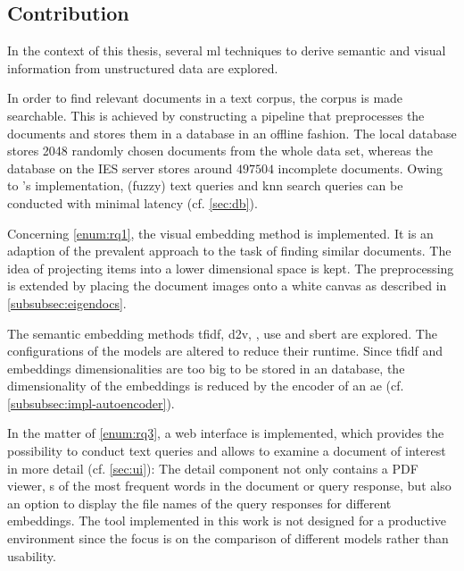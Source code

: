 \subsection{Contribution}\label{subsec:contribution}

In the context of this thesis, several \ac{ml} techniques to derive semantic and visual information 
from unstructured data are explored.

In order to find relevant documents in a text corpus, the corpus is made searchable.
This is achieved by constructing a pipeline that preprocesses the documents 
and stores them in a database in an offline fashion.
The local \databaseName{} database stores 2048 randomly chosen documents from the whole data set, 
whereas the database on the IES server stores around $497504$ incomplete documents.
Owing to \databaseName{}'s implementation, (fuzzy) text queries and \ac{knn} search queries 
can be conducted with minimal latency (cf. \autoref{sec:db}).

Concerning \ref{enum:rq1}, the visual embedding method \eigendocs{} is implemented.
It is an adaption of the prevalent \eigenfaces{} approach to the task of finding similar documents.
The idea of projecting items into a lower dimensional space is kept.
The preprocessing is extended by placing the document images onto a white canvas 
as described in \autoref{subsubsec:eigendocs}.

The semantic embedding methods \ac{tfidf}, \ac{d2v}, \infersent{}, \ac{use} and \ac{sbert} are explored.
The configurations of the models are altered to reduce their runtime.
Since \ac{tfidf} and \infersent{} embeddings dimensionalities are too big 
to be stored in an \databaseName{} database, 
the dimensionality of the embeddings is reduced by the encoder of an \ac{ae} 
(cf. \autoref{subsubsec:impl-autoencoder}).
 
In the matter of \ref{enum:rq3}, a web interface is implemented, 
which provides the possibility to conduct text queries and
allows to examine a document of interest in more detail (cf. \autoref{sec:ui}):
The detail component not only contains a PDF viewer, 
\wordcloud{}s of the most frequent words in the document or query response, 
but also an option to display the file names of the query responses for different embeddings.
The tool implemented in this work is not designed for a productive environment since 
the focus is on the comparison of different models rather than usability.


